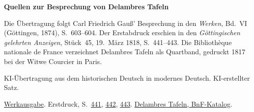 \clearpage\thispagestyle{empty}
\begin{center}\Large\bfseries Quellen zur Besprechung von Delambres Tafeln\end{center}

Die Übertragung folgt Carl Friedrich Gauß’ Besprechung in den \emph{Werken}, Bd.~VI (Göttingen, 1874), S.~603--604. Der Erstabdruck erschien in den \emph{Göttingischen gelehrten Anzeigen}, Stück~45, 19.~März 1818, S.~441--443. Die Bibliothèque nationale de France verzeichnet Delambres Tafeln als Quartband, gedruckt 1817 bei der Witwe Courcier in Paris.

KI-Übertragung aus dem historischen Deutsch in modernes Deutsch. KI-erstellter Satz.

\href{https://gdz.sub.uni-goettingen.de/id/PPN236007467}{Werkausgabe}. Erstdruck, S.~\href{https://images.p.sub.uni-goettingen.de/iiif/image/gdz:PPN319721507_1818:00000447/full/1650,/0/default.jpg}{441}, \href{https://images.p.sub.uni-goettingen.de/iiif/image/gdz:PPN319721507_1818:00000448/full/1650,/0/default.jpg}{442}, \href{https://images.p.sub.uni-goettingen.de/iiif/image/gdz:PPN319721507_1818:00000449/full/1650,/0/default.jpg}{443}. \href{https://catalogue.bnf.fr/ark:/12148/cb30313540f}{Delambres Tafeln, BnF-Katalog}.

\clearpage
